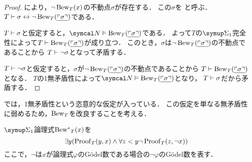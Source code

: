 \begin{proof}
	により，\(\lnot \apply{\Bew_T}{x}\)の不動点\(\sigma\)が存在する．
	この\(\sigma\)を
	と呼ぶ．
	\(T \provable \sigma \formulaequiv \lnot \apply{\Bew_T}{\numeral{\GodelNumber{\sigma}}}\)である．

	\(T \vdash \sigma\)と仮定すると，\(\standardmodel \satisfy \apply{\Bew_T}{\numeral{\GodelNumber{\sigma}}}\)である．
	よって\(T\)の\(\SigmaFormula_1\)完全性によって\(T \provable \apply{\Bew_T}{\numeral{\GodelNumber{\sigma}}}\)が成り立つ．
	このとき，\(\sigma\)は\(\lnot \apply{\Bew_T}{\numeral{\GodelNumber{\sigma}}}\)の不動点であることから
	\(T \vdash \lnot \sigma\)となって矛盾する．

	\(T \vdash \lnot \sigma\)と仮定すると，\(\sigma\)が\(\lnot \apply{\Bew_T}{\numeral{\GodelNumber{\sigma}}}\)の不動点であることから
	\(T \provable \apply{\Bew_T}{\numeral{\GodelNumber{\sigma}}}\)となる．
	\(T\)の1無矛盾性によって\(\standardmodel \satisfy \apply{\Bew_T}{\numeral{\GodelNumber{\sigma}}}\)となり，
	\(T \vdash \sigma\)だから矛盾する．
\end{proof}

では，1無矛盾性という恣意的な仮定が入っている．
この仮定を単なる無矛盾性に弱めるため，\(\operatorname{Bew}_T\)を改良することを考える．

\begin{Def} \label{Def:Bewstar}
	\(\SigmaFormula_1\)論理式\(\apply{\Bewstar_T}{x}\)を
	\begin{equation}
		\exists y \paren{\apply{\ProofPredicate_T}{y, x} \land \forall z < y \lnot \apply{\ProofPredicate_T}{z, \lnot x}}
		\label{eq:Bewstar}
	\end{equation}
	ここで，\(\lnot\)は\(x\)が論理式\(\varphi\)のGödel数である場合の\(\lnot \varphi\)のGödel数を表す．
\end{Def}


